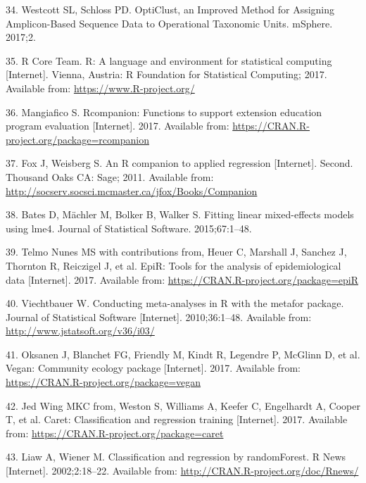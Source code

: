 \documentclass[12pt,]{article}
\begin{document}
\hypertarget{ref-westcott_opticlust_2017}{}
34. Westcott SL, Schloss PD. OptiClust, an Improved Method for Assigning
Amplicon-Based Sequence Data to Operational Taxonomic Units. mSphere.
2017;2.

\hypertarget{ref-r_citation_2017}{}
35. R Core Team. R: A language and environment for statistical computing
{[}Internet{]}. Vienna, Austria: R Foundation for Statistical Computing;
2017. Available from: \url{https://www.R-project.org/}

\hypertarget{ref-rcompanion_citation_2017}{}
36. Mangiafico S. Rcompanion: Functions to support extension education
program evaluation {[}Internet{]}. 2017. Available from:
\url{https://CRAN.R-project.org/package=rcompanion}

\hypertarget{ref-car_citation_2011}{}
37. Fox J, Weisberg S. An R companion to applied regression
{[}Internet{]}. Second. Thousand Oaks CA: Sage; 2011. Available from:
\url{http://socserv.socsci.mcmaster.ca/jfox/Books/Companion}

\hypertarget{ref-lme4_citation_2015}{}
38. Bates D, Mächler M, Bolker B, Walker S. Fitting linear mixed-effects
models using lme4. Journal of Statistical Software. 2015;67:1--48.

\hypertarget{ref-epir_citation_2017}{}
39. Telmo Nunes MS with contributions from, Heuer C, Marshall J, Sanchez
J, Thornton R, Reiczigel J, et al. EpiR: Tools for the analysis of
epidemiological data {[}Internet{]}. 2017. Available from:
\url{https://CRAN.R-project.org/package=epiR}

\hypertarget{ref-metafor_citation_2010}{}
40. Viechtbauer W. Conducting meta-analyses in R with the metafor
package. Journal of Statistical Software {[}Internet{]}. 2010;36:1--48.
Available from: \url{http://www.jstatsoft.org/v36/i03/}

\hypertarget{ref-vegan_citation_2017}{}
41. Oksanen J, Blanchet FG, Friendly M, Kindt R, Legendre P, McGlinn D,
et al. Vegan: Community ecology package {[}Internet{]}. 2017. Available
from: \url{https://CRAN.R-project.org/package=vegan}

\hypertarget{ref-caret_citation_2017}{}
42. Jed Wing MKC from, Weston S, Williams A, Keefer C, Engelhardt A,
Cooper T, et al. Caret: Classification and regression training
{[}Internet{]}. 2017. Available from:
\url{https://CRAN.R-project.org/package=caret}

\hypertarget{ref-randomforest_citation_2002}{}
43. Liaw A, Wiener M. Classification and regression by randomForest. R
News {[}Internet{]}. 2002;2:18--22. Available from:
\url{http://CRAN.R-project.org/doc/Rnews/}
\end{document}
